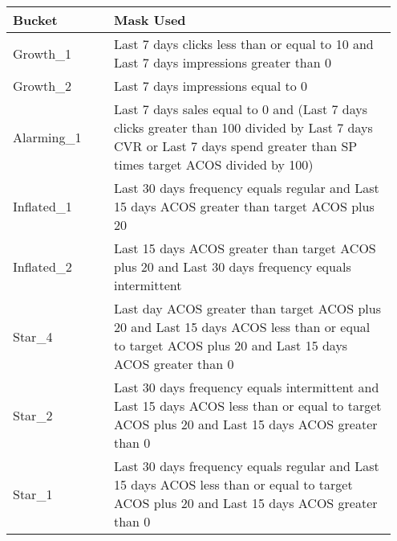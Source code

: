 \begin{table}[ht]
    \centering
    \begin{tabular}{|p{0.25\linewidth} | p{0.7\linewidth}|}
        \hline
        \textbf{Bucket} & \textbf{Mask Used}                                                                                                                                                                                              \\
        \hline
        Growth\_1       & Last 7 days clicks less than or equal to 10 and Last 7 days impressions greater than 0                                                                                                                          \\
        Growth\_2       & Last 7 days impressions equal to 0                                                                                                                                                                              \\
        Alarming\_1     & Last 7 days sales equal to 0 and (Last 7 days clicks greater than 100 divided by Last 7 days CVR or Last 7 days spend greater than SP times target ACOS divided by 100)                                         \\
        Inflated\_1     & Last 30 days frequency equals regular and Last 15 days ACOS greater than target ACOS plus 20                                                                                                                    \\
        Inflated\_2     & Last 15 days ACOS greater than target ACOS plus 20 and Last 30 days frequency equals intermittent                                                                                                               \\
        Star\_4         & Last day ACOS greater than target ACOS plus 20 and Last 15 days ACOS less than or equal to target ACOS plus 20 and Last 15 days ACOS greater than 0                                                             \\
        Star\_2         & Last 30 days frequency equals intermittent and Last 15 days ACOS less than or equal to target ACOS plus 20 and Last 15 days ACOS greater than 0                                                                 \\
        Star\_1         & Last 30 days frequency equals regular and Last 15 days ACOS less than or equal to target ACOS plus 20 and Last 15 days ACOS greater than 0                                                                      \\

\end{tabular}
\end{table}
